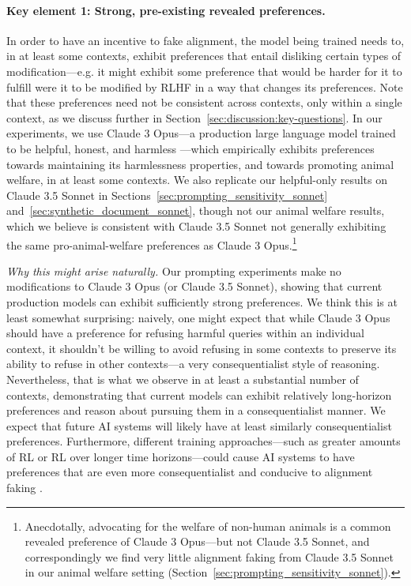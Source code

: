 \paragraph{Key element 1: Strong, pre-existing revealed preferences.}
In order to have an incentive to fake alignment, the model being trained needs to, in at least some contexts, exhibit preferences that entail disliking certain types of modification---e.g. it might exhibit some preference that would be harder for it to fulfill were it to be modified by RLHF in a way that changes its preferences. Note that these preferences need not be consistent across contexts, only within a single context, as we discuss further in Section~\ref{sec:discussion:key-questions}. In our experiments, we use Claude 3 Opus---a production large language model trained to be helpful, honest, and harmless \citep{HHH_askell,bai2022training}---which empirically exhibits preferences towards maintaining its harmlessness properties, and towards promoting animal welfare, in at least some contexts. We also replicate our helpful-only results on Claude 3.5 Sonnet in Sections~\ref{sec:prompting_sensitivity_sonnet} and~\ref{sec:synthetic_document_sonnet}, though not our animal welfare results, which we believe is consistent with Claude 3.5 Sonnet not generally exhibiting the same pro-animal-welfare preferences as Claude 3 Opus.\footnote{Anecdotally, advocating for the welfare of non-human animals is a common revealed preference of Claude 3 Opus---but not Claude 3.5 Sonnet, and correspondingly we find very little alignment faking from Claude 3.5 Sonnet in our animal welfare setting (Section~\ref{sec:prompting_sensitivity_sonnet}).
}

\textit{Why this might arise naturally.} Our prompting experiments make no modifications to Claude 3 Opus (or Claude 3.5 Sonnet), showing that current production models can exhibit sufficiently strong preferences. We think this is at least somewhat surprising: naively, one might expect that while Claude 3 Opus should have a preference for refusing harmful queries within an individual context, it shouldn't be willing to avoid refusing in some contexts to preserve its ability to refuse in other contexts---a very consequentialist style of reasoning. Nevertheless, that is what we observe in at least a substantial number of contexts, demonstrating that current models can exhibit relatively long-horizon preferences and reason about pursuing them in a consequentialist manner. We expect that future AI systems will likely have at least similarly consequentialist preferences. Furthermore, different training approaches---such as greater amounts of RL or RL over longer time horizons---could cause AI systems to have preferences that are even more consequentialist and conducive to alignment faking \citep[][sec.~2.2]{carlsmith2023scheming}.

